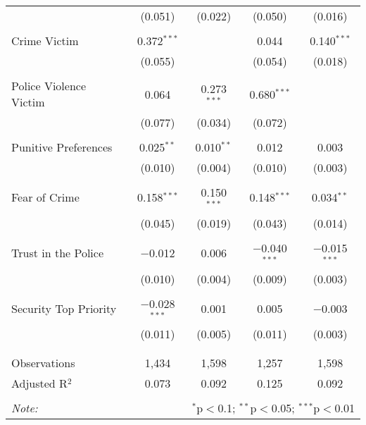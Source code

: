 \begin{table}[!htbp]
\begin{tabular}{@{\extracolsep{5pt}}lcccc}
  & (0.051) & (0.022) & (0.050) & (0.016) \\ 
  & & & & \\ 
  Crime Victim & 0.372$^{***}$ &  & 0.044 & 0.140$^{***}$ \\ 
  & (0.055) &  & (0.054) & (0.018) \\ 
  & & & & \\ 
 Police Violence Victim & 0.064 & 0.273$^{***}$ & 0.680$^{***}$ &  \\ 
  & (0.077) & (0.034) & (0.072) &  \\ 
  & & & & \\ 
 Punitive Preferences & 0.025$^{**}$ & 0.010$^{**}$ & 0.012 & 0.003 \\ 
  & (0.010) & (0.004) & (0.010) & (0.003) \\ 
  & & & & \\ 
 Fear of Crime & 0.158$^{***}$ & 0.150$^{***}$ & 0.148$^{***}$ & 0.034$^{**}$ \\ 
  & (0.045) & (0.019) & (0.043) & (0.014) \\ 
  & & & & \\ 
 Trust in the Police & $-$0.012 & 0.006 & $-$0.040$^{***}$ & $-$0.015$^{***}$ \\ 
  & (0.010) & (0.004) & (0.009) & (0.003) \\ 
  & & & & \\ 
 Security Top Priority & $-$0.028$^{***}$ & 0.001 & 0.005 & $-$0.003 \\ 
  & (0.011) & (0.005) & (0.011) & (0.003) \\ 
  & & & & \\ 
\hline \\[-1.8ex] 
Observations & 1,434 & 1,598 & 1,257 & 1,598 \\ 
Adjusted R$^{2}$ & 0.073 & 0.092 & 0.125 & 0.092 \\ 
\hline 
\hline \\[-1.8ex] 
\textit{Note:}  & \multicolumn{4}{r}{$^{*}$p$<$0.1; $^{**}$p$<$0.05; $^{***}$p$<$0.01} \\ 
\end{tabular} 
\end{table} 
